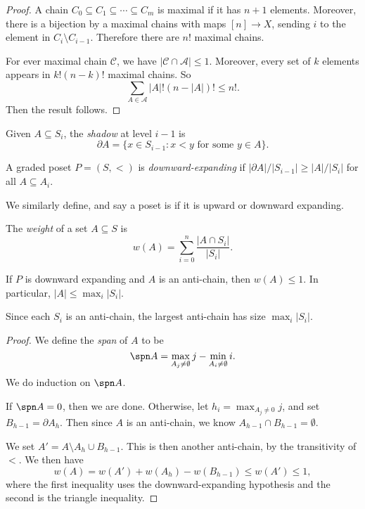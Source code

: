 \documentclass[a4paper]{article}
\begin{document}
\begin{proof}
  A chain $C_0 \subseteq C_1 \subseteq \cdots \subseteq C_m$ is maximal if it has $n + 1$ elements. Moreover, there is a bijection by a maximal chains with maps $[n] \to X$, sending $i$ to the element in $C_i \setminus C_{i - 1}$. Therefore there are $n!$ maximal chains.

  For ever maximal chain $\mathcal{C}$, we have $|\mathcal{C} \cap \mathcal{A}| \leq 1$. Moreover, every set of $k$ elements appears in $k! (n - k)!$ maximal chains. So
  \[
    \sum_{A \in \mathcal{A}} |A|! (n - |A|)! \leq n!.
  \]
  Then the result follows.
\end{proof}

\begin{defi}[Shadow]
  Given $A \subseteq S_i$, the \emph{shadow} at level $i - 1$ is
  \[
    \partial A = \{x \in S_{i - 1}: x < y\text{ for some }y \in A\}.
  \]
\end{defi}

\begin{defi}
  A graded poset $P = (S, <)$ is \emph{downward-expanding} if $|\partial A|/|S_{i - 1}| \geq |A|/|S_i|$ for all $A \subseteq A_i$.

  We similarly define, and say a poset is  if it is upward or downward expanding. %
\end{defi}
\begin{defi}[Weight]
  The \emph{weight} of a set $A \subseteq S$ is
  \[
    w(A) = \sum_{i = 0}^n \frac{|A \cap S_i|}{|S_i|}.
  \]
\end{defi}

\begin{thm}
  If $P$ is downward expanding and $A$ is an anti-chain, then $w(A) \leq 1$. In particular, $|A| \leq \max_i |S_i|$.

  Since each $S_i$ is an anti-chain, the largest anti-chain has size $\max_i |S_i|$.
\end{thm}

\begin{proof}
  We define the \emph{span} of $A$ to be
  \[
    \spn A = \max_{A_j \not= \emptyset} j - \min_{A_i \not= \emptyset} i.
  \]
  We do induction on $\spn A$.

  If $\spn A = 0$, then we are done. Otherwise, let $h_i = \max_{A_j \not= 0} j$, and set $B_{h - 1} = \partial A_h$. Then since $A$ is an anti-chain, we know $A_{h - 1} \cap B_{h - 1} = \emptyset$.

  We set $A' = A \setminus A_h \cup B_{h - 1}$. This is then another anti-chain, by the transitivity of $<$. We then have
  \[
    w(A) = w(A') + w(A_h) - w(B_{h - 1}) \leq w(A') \leq 1,
  \]
  where the first inequality uses the downward-expanding hypothesis and the second is the triangle inequality.
\end{proof}
\end{document}
